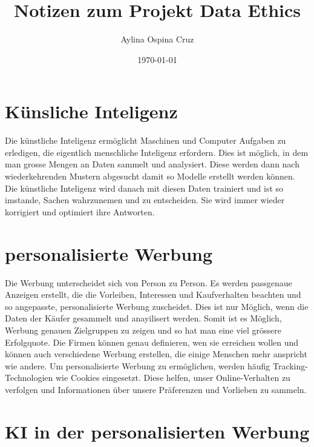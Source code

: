 \documentclass{article}
\title{Notizen zum Projekt Data Ethics}
\author{Aylina Ospina Cruz}
\date{\today}
\begin{document}
\maketitle


\tableofcontents


\section{Künsliche Inteligenz}

Die künstliche Inteligenz ermöglicht Maschinen und Computer Aufgaben zu erledigen, die eigentlich menschliche Inteligenz erfordern. Dies ist möglich, in dem man grosse Mengen an Daten sammelt und analysiert. Diese werden dann nach wiederkehrenden Mustern abgesucht damit so Modelle erstellt werden können. Die künstliche Inteligenz wird danach mit diesen Daten trainiert und ist so imstande, Sachen wahrzunemen und zu entscheiden. Sie wird immer wieder korrigiert und optimiert ihre Antworten. 

\section{personalisierte Werbung}
 Die Werbung unterscheidet sich von Person zu Person. Es werden passgenaue Anzeigen erstellt, die die Vorleiben, Interessen und Kaufverhalten beachten und so angepasste, personalisierte Werbung zuscheidet. Dies ist nur Möglich, wenn die Daten der Käufer gesammelt und anayilisert werden. Somit ist es Möglich, Werbung genauen Zielgruppen zu zeigen und so hat man eine viel grössere Erfolgquote. Die Firmen können genau definieren, wen sie erreichen wollen und können auch verschiedene Werbung erstellen, die einige Menschen mehr anspricht wie andere. Um personalisierte Werbung zu ermöglichen, werden häufig Tracking-Technologien wie Cookies eingesetzt. Diese helfen, unser Online-Verhalten zu verfolgen und Informationen über unsere Präferenzen und Vorlieben zu sammeln. 

 \section{KI in der personalisierten Werbung}
\end{document}
